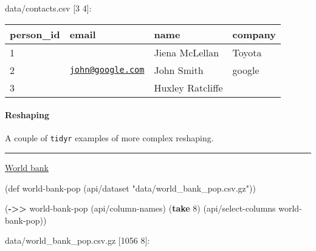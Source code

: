 \documentclass[]{article}
\newenvironment{Shaded}{\begin{snugshade}}{\end{snugshade}}
\newcommand{\BuiltInTok}[1]{#1}
\newcommand{\DecValTok}[1]{\textcolor[rgb]{0.00,0.00,0.81}{#1}}
\newcommand{\FunctionTok}[1]{\textcolor[rgb]{0.00,0.00,0.00}{#1}}
\newcommand{\KeywordTok}[1]{\textcolor[rgb]{0.13,0.29,0.53}{\textbf{#1}}}
\newcommand{\NormalTok}[1]{#1}
\newcommand{\StringTok}[1]{\textcolor[rgb]{0.31,0.60,0.02}{#1}}
\let\oldparagraph\paragraph
\renewcommand{\paragraph}[1]{\oldparagraph{#1}\mbox{}}
\begin{document}
data/contacts.csv {[}3 4{]}:

\begin{longtable}[]{@{}llll@{}}
\toprule
person\_id & email & name & company\tabularnewline
\midrule
\endhead
1 & & Jiena McLellan & Toyota\tabularnewline
2 & \href{mailto:john@google.com}{\nolinkurl{john@google.com}} & John
Smith & google\tabularnewline
3 & & Huxley Ratcliffe &\tabularnewline
\bottomrule
\end{longtable}

\hypertarget{reshaping}{%
\paragraph{Reshaping}\label{reshaping}}

A couple of \texttt{tidyr} examples of more complex reshaping.

\begin{center}\rule{0.5\linewidth}{0.5pt}\end{center}

\href{https://tidyr.tidyverse.org/articles/pivot.html\#world-bank}{World
bank}

\begin{Shaded}
\begin{Highlighting}[]
\NormalTok{(}\BuiltInTok{def}\FunctionTok{ world-bank-pop }\NormalTok{(api/dataset }\StringTok{"data/world_bank_pop.csv.gz"}\NormalTok{))}
\end{Highlighting}
\end{Shaded}

\begin{Shaded}
\begin{Highlighting}[]
\NormalTok{(}\KeywordTok{->>}\NormalTok{ world-bank-pop}
\NormalTok{     (api/column-names)}
\NormalTok{     (}\KeywordTok{take} \DecValTok{8}\NormalTok{)}
\NormalTok{     (api/select-columns world-bank-pop))}
\end{Highlighting}
\end{Shaded}

data/world\_bank\_pop.csv.gz {[}1056 8{]}:
\end{document}
